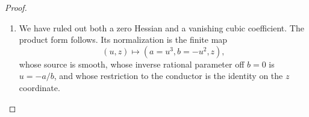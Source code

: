 \begin{proof}
\begin{enumerate}[label={$\langle1\rangle$\arabic*.},leftmargin=*]
\item We have ruled out both a zero
Hessian and a vanishing cubic
coefficient. The product form
follows. Its normalization is
the finite map
\[
 (u,z)\longmapsto (a=u^3,b=-u^2,z),
\]
whose source is smooth, whose
inverse rational parameter off
$b=0$ is $u=-a/b$, and whose
restriction to the conductor is
the identity on the $z$ coordinate.

\end{enumerate}
\end{proof}
